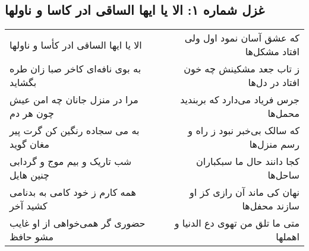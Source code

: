 \begin{center}
\section*{غزل شماره ۱: الا یا ایها الساقی ادر کاسا و ناولها}
\label{sec:sh001}
\begin{longtable}{l p{0.5cm} r}
الا یا ایها الساقی ادر کأسا و ناولها
&&
که عشق آسان نمود اول ولی افتاد مشکل‌ها
\\
به بوی نافه‌ای کاخر صبا زان طره بگشاید
&&
ز تاب جعد مشکینش چه خون افتاد در دل‌ها
\\
مرا در منزل جانان چه امن عیش چون هر دم
&&
جرس فریاد می‌دارد که بربندید محمل‌ها
\\
به می سجاده رنگین کن گرت پیر مغان گوید
&&
که سالک بی‌خبر نبود ز راه و رسم منزل‌ها
\\
شب تاریک و بیم موج و گردابی چنین هایل
&&
کجا دانند حال ما سبکباران ساحل‌ها
\\
همه کارم ز خود کامی به بدنامی کشید آخر
&&
نهان کی ماند آن رازی کز او سازند محفل‌ها
\\
حضوری گر همی‌خواهی از او غایب مشو حافظ
&&
متی ما تلق من تهوی دع الدنیا و اهملها
\\
\end{longtable}
\end{center}
